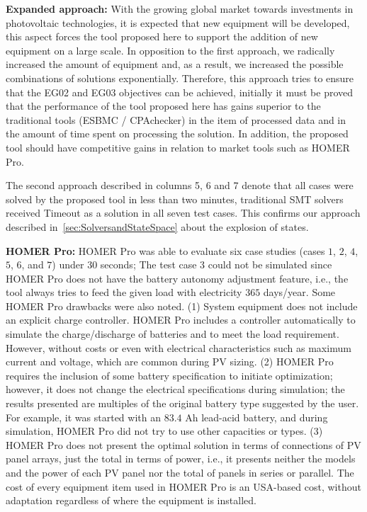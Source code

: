 \documentclass[10pt,journal,compsoc]{IEEEtran}
\begin{document}

\textbf{Expanded approach:} With the growing global market towards investments in photovoltaic technologies, it is expected that new equipment will be developed, this aspect forces the tool proposed here to support the addition of new equipment on a large scale. In opposition to the first approach, we radically increased the amount of equipment and, as a result, we increased the possible combinations of solutions exponentially. Therefore, this approach tries to ensure that the EG02 and EG03 objectives can be achieved, initially it must be proved that the performance of the tool proposed here has gains superior to the traditional tools (ESBMC / CPAchecker) in the item of processed data and in the amount of time spent on processing the solution. In addition, the proposed tool should have competitive gains in relation to market tools such as HOMER Pro.

The second approach described in columns 5, 6 and 7 denote that all cases were solved by the proposed tool in less than two minutes, traditional SMT solvers received Timeout as a solution in all seven test cases. This confirms our approach described in~\ref{sec:SolversandStateSpace} about the explosion of states.

\color{black} \textbf{HOMER Pro:} HOMER Pro was able to evaluate six case studies (cases $1$, $2$, $4$, $5$, $6$, and $7$) under $30$ seconds; The test case $3$ could not be simulated since HOMER Pro does not have the battery autonomy adjustment feature, i.e., the tool always tries to feed the given load with electricity $365$ days/year. Some HOMER Pro drawbacks were also noted. (1) System equipment does not include an explicit charge controller. HOMER Pro includes a controller automatically to simulate the charge/discharge of batteries and to meet the load requirement. However, without costs or even with electrical characteristics such as maximum current and voltage, which are common during PV sizing. (2) HOMER Pro requires the inclusion of some battery specification to initiate optimization; however, it does not change the electrical specifications during simulation; the results presented are multiples of the original battery type suggested by the user. For example, it was started with an $83.4$ Ah lead-acid battery, and during simulation, HOMER Pro did not try to use other capacities or types. (3) HOMER Pro does not present the optimal solution in terms of connections of PV panel arrays, just the total in terms of power, i.e., it presents neither the models and the power of each PV panel nor the total of panels in series or parallel. The cost of every equipment item used in HOMER Pro is an USA-based cost, without adaptation regardless of where the equipment is installed. \color{black}
\end{document}
